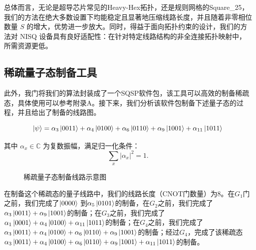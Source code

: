 \documentclass[10.5pt,compsoc,UTF8]{CjC}
\theoremstyle{mystyle}
\begin{document}
 

总体而言，无论是超导芯片常见的Heavy-Hex拓扑，还是规则网格的Square\_25，我们的方法在绝大多数设置下均能稳定且显著地压缩线路长度，并且随着非零相位数量 $S$ 的增大，优势进一步放大。同时，得益于面向拓扑约束的设计，我们的方法对 NISQ 设备具有良好适配性：在针对特定线路结构的非全连接拓扑映射中，所需资源更低。\par

\subsection{稀疏量子态制备工具}

此外，我门将我们的算法封装成了一个SQSP软件包，该工具可以高效的制备稀疏态，具体使用可以参考附录A。接下来，我们分析该软件包制备下述量子态的过程，并且给出了制备的线路图。

$$
\ket{\psi} = \alpha_3 \ket{0011} + \alpha_4 \ket{0100} + \alpha_6 \ket{0110} + \alpha_9 \ket{1001} + \alpha_{11} \ket{1011}
$$

其中 $\alpha_x \in \mathbb{C}$ 为复数振幅，满足归一化条件：
$$
\sum_{x} |\alpha_x|^2 = 1.
$$


\begin{figure}[H]
\hfil
{}

    \caption{稀疏量子态制备线路示意图}
\end{figure}

在制备这个稀疏态的量子线路中，我们的线路长度（CNOT门数量）为8。在$G_1$门之前，我们完成了$\ket{0000}$ 到$\alpha_5 \ket{0101}$的制备，在$G_2$之前，我们完成了$\alpha_3 \ket{0011} + \alpha_9 \ket{1001}$的制备；在$G_3$之前，我们完成了$\alpha_1 \ket{0001} + \alpha_4 \ket{0100} + \alpha_{11} \ket{1011}$的制备；在$G_4$之前，我们完成了$\alpha_3 \ket{0011} + \alpha_4 \ket{0100} + \alpha_6 \ket{0110} + \alpha_9 \ket{1001}$的制备；经过$G_4$，完成了该稀疏态$\alpha_3 \ket{0011} + \alpha_4 \ket{0100} + \alpha_6 \ket{0110} + \alpha_9 \ket{1001} + \alpha_{11} \ket{1011}$的制备。
\end{document}
